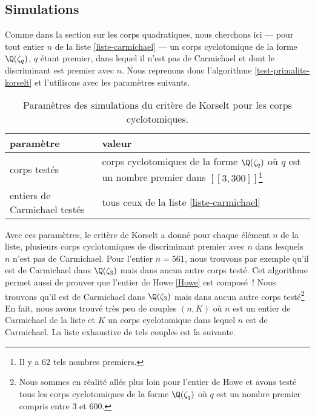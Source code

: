 \subsection{Simulations}

Comme dans la section sur les corps quadratiques, nous cherchons ici — pour tout entier $n$ de la liste \ref{liste-carmichael} — un corps cyclotomique de la forme $\Q(\zeta_q)$, $q$ étant premier, dans lequel il n'est pas de Carmichael et dont le discriminant est premier avec $n$. Nous reprenons donc l'algorithme \ref{test-primalite-korselt} et l'utilisons avec les paramètres suivants.

\begin{table}[H]\label{param-korselt-cyclo}
	\begin{center}
		\begin{tabularx}{\textwidth}{|Y|Y|}
			\hline
			paramètre & valeur \\
			\hline
			\hline
			corps testés & corps cyclotomiques de la forme $\Q(\zeta_q)$ où $q$ est un nombre premier dans $[\![3, 300]\!]$\footnote{Il y a 62 tels nombres premiers.} \\\hline
			entiers de Carmichael testés & tous ceux de la liste \ref{liste-carmichael} \\\hline
		\end{tabularx}
		\caption{Paramètres des simulations du critère de Korselt pour les corps cyclotomiques.}
	\end{center}
\end{table}

Avec ces paramètres, le critère de Korselt a donné pour chaque élément $n$ de la liste, plusieurs corps cyclotomiques de discriminant premier avec $n$ dans lesquels $n$ n'est pas de Carmichael. Pour l'entier $n = 561$, nous trouvons par exemple qu'il est de Carmichael dans $\Q(\zeta_3)$ mais dans aucun autre corps testé. Cet algorithme permet aussi de prouver que l'entier de Howe \ref{Howe} est composé~! Nous trouvons qu'il est de Carmichael dans $\Q(\zeta_3)$ mais dans aucun autre corps testé\footnote{Nous sommes en réalité allés plus loin pour l'entier de Howe et avons testé tous les corps cyclotomiques de la forme $\Q(\zeta_q)$ où $q$ est un nombre premier compris entre $3$ et $600$.} En fait, nous avons trouvé très peu de couples $(n, K)$ où $n$ est un entier de Carmichael de la liste et $K$ un corps cyclotomique dans lequel $n$ est de Carmichael. La liste exhaustive de tels couples est la suivante.

